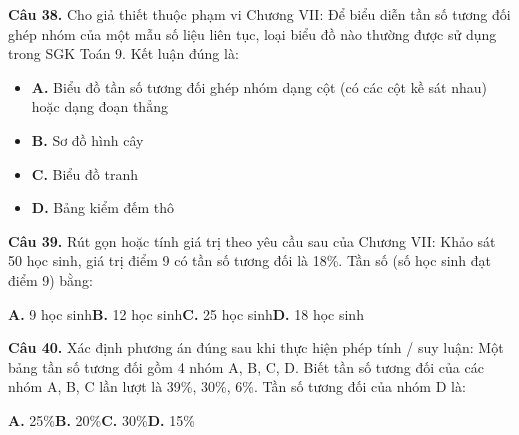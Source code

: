 \documentclass[11pt,a4paper]{article}
\begin{document}
\textbf{\color{primary} Câu 38.} Cho giả thiết thuộc phạm vi Chương VII: Để biểu diễn tần số tương đối ghép nhóm của một mẫu số liệu liên tục, loại biểu đồ nào thường được sử dụng trong SGK Toán 9. Kết luận đúng là:\par
\begin{itemize}\setlength{\itemsep}{1pt}\setlength{\parskip}{0pt}
  \item[] \textbf{A.} Biểu đồ tần số tương đối ghép nhóm dạng cột (có các cột kề sát nhau) hoặc dạng đoạn thẳng
  \item[] \textbf{B.} Sơ đồ hình cây
  \item[] \textbf{C.} Biểu đồ tranh
  \item[] \textbf{D.} Bảng kiểm đếm thô
\end{itemize}\vspace{2pt}
\textbf{\color{primary} Câu 39.} Rút gọn hoặc tính giá trị theo yêu cầu sau của Chương VII: Khảo sát 50 học sinh, giá trị điểm 9 có tần số tương đối là 18\%. Tần số (số học sinh đạt điểm 9) bằng:\par
\hspace*{1.5em}\textbf{A.} 9 học sinh\quad\quad \textbf{B.} 12 học sinh\quad\quad \textbf{C.} 25 học sinh\quad\quad \textbf{D.} 18 học sinh\par\vspace{2pt}
\textbf{\color{primary} Câu 40.} Xác định phương án đúng sau khi thực hiện phép tính / suy luận: Một bảng tần số tương đối gồm 4 nhóm A, B, C, D. Biết tần số tương đối của các nhóm A, B, C lần lượt là 39\%, 30\%, 6\%. Tần số tương đối của nhóm D là:\par
\hspace*{1.5em}\textbf{A.} 25\%\quad\quad \textbf{B.} 20\%\quad\quad \textbf{C.} 30\%\quad\quad \textbf{D.} 15\%\par\vspace{2pt}
\end{document}
